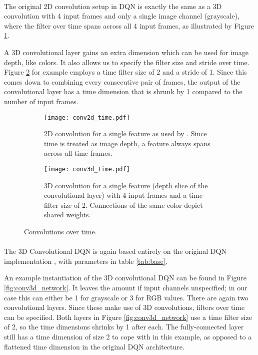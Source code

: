 \paragraph{}
The original 2D convolution setup in DQN
is exactly the same as a 3D convolution
with 4 input frames and only a single image channel (grayscale),
where the filter over time spans across all 4 input frames,
as illustrated by Figure \ref{fig:conv2d_time}.

A 3D convolutional layer gains an extra dimension
which can be used for image depth, like colors.
It also allows us to specify the filter size and stride over time.
Figure \ref{fig:conv3d_time} for example
employs a time filter size of 2 and a stride of 1.
Since this comes down to combining every consecutive pair of frames,
the output of the convolutional layer has a time dimension
that is shrunk by 1 compared to the number of input frames.

\begin{figure}[!htpb]
  \begin{subfigure}[t]{.45\textwidth}
    \centering
    \texttt{[image: conv2d\_time.pdf]}
    \caption{
      2D convolution for a single feature as used by \cite{Mnih2013}.
      Since time is treated as image depth,
      a feature always spans across all time frames.
    }
    \label{fig:conv2d_time}
  \end{subfigure}
  \hfill
  \begin{subfigure}[t]{.45\textwidth}
    \centering
    \texttt{[image: conv3d\_time.pdf]}
    \caption{
      3D convolution for a single feature
      (depth slice of the convolutional layer)
      with 4 input frames
      and a time filter size of 2.
      Connections of the same color depict shared weights.
    }
    \label{fig:conv3d_time}
  \end{subfigure}
  \caption{
    Convolutions over time.
  }
  \label{fig:conv3d}
\end{figure}

\paragraph{}
The 3D Convolutional DQN
is again based entirely on the original DQN implementation
\parencite{Mnih2013},
with parameters in table \ref{tab:base}.

An example instantiation of the 3D convolutional DQN
can be found in Figure \ref{fig:conv3d_network}.
It leaves the amount if input channels unspecified;
in our case this can either be 1 for grayscale
or 3 for RGB values.
There are again two convolutional layers.
Since these make use of 3D convolutions,
filters over time can be specified.
Both layers in Figure \ref{fig:conv3d_network}
use a time filter size of 2,
so the time dimensions shrinks by 1 after each.
The fully-connected layer
still has a time dimension of size 2 to cope with in this example,
as opposed to a flattened time dimension in the original DQN architecture.


